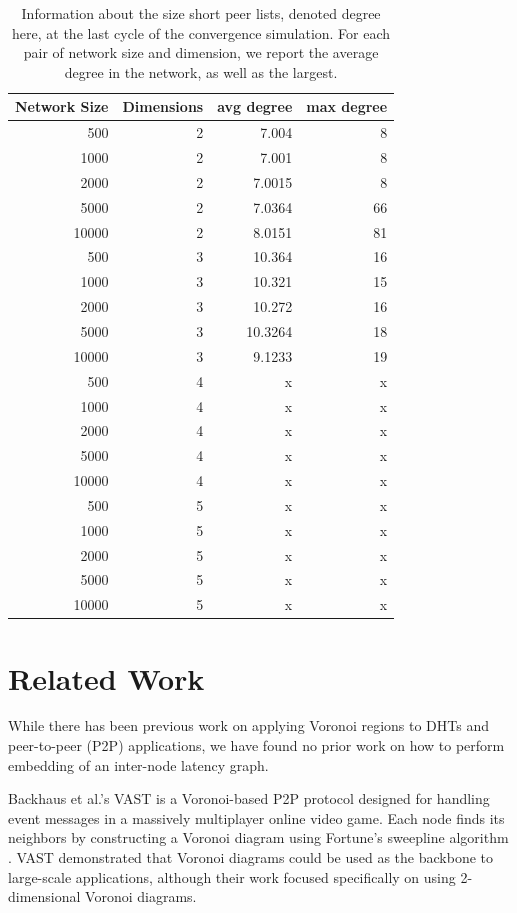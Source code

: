 \begin{table}
\centering
\begin{tabular}{|r|r|r|r|}
\hline
Network Size & Dimensions & avg degree & max degree\\ \hline
500   & 2 & 7.004 & 8 \\ \hline
1000  & 2 & 7.001 & 8 \\ \hline
2000  & 2 & 7.0015 & 8 \\ \hline
5000  & 2 & 7.0364 & 66 \\ \hline
10000 & 2 & 8.0151 & 81\\ \hline  %
500   & 3 & 10.364 & 16 \\ \hline
1000  & 3 & 10.321 & 15 \\ \hline
2000  & 3 & 10.272 & 16 \\ \hline
5000  & 3 & 10.3264 & 18 \\ \hline
10000 & 3 & 9.1233 & 19 \\ \hline
500   & 4 & x & x \\ \hline
1000  & 4 & x & x \\ \hline
2000  & 4 & x & x \\ \hline
5000  & 4 & x & x \\ \hline
10000 & 4 & x & x \\ \hline
500   & 5 & x & x \\ \hline
1000  & 5 & x & x \\ \hline
2000  & 5 & x & x \\ \hline
5000  & 5 & x & x \\ \hline
10000 & 5 & x & x \\ \hline
\end{tabular}
\caption{Information about the size short peer lists, denoted degree here, at the last cycle of the convergence simulation.  For each pair of network size and dimension, we report the average degree in the network, as well as the largest.}
\label{tab:convtable}
\end{table}


\section{Related Work}
\label{sec:related}
While there has been previous work on applying Voronoi regions to DHTs and peer-to-peer (P2P) applications, we have found no prior work on how to perform embedding of an inter-node latency graph.   

Backhaus et al.'s  VAST \cite{Backhaus:2007:VAS:1326257.1326266} is a Voronoi-based P2P protocol designed for handling event messages in a massively multiplayer online video game.  
Each node finds its neighbors by constructing a Voronoi diagram using Fortune's sweepline algorithm \cite{fortune1987sweepline}.  
VAST demonstrated that Voronoi diagrams could be used as the backbone to large-scale applications, although their work focused specifically on using 2-dimensional Voronoi diagrams.

